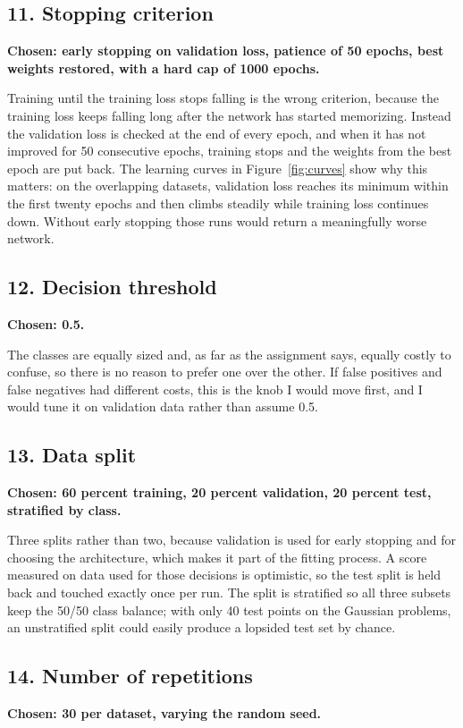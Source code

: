 \documentclass[11pt]{article}
\begin{document}
\subsection*{11. Stopping criterion}
\textbf{Chosen: early stopping on validation loss, patience of 50 epochs,
best weights restored, with a hard cap of 1000 epochs.}

Training until the training loss stops falling is the wrong criterion, because
the training loss keeps falling long after the network has started memorizing.
Instead the validation loss is checked at the end of every epoch, and when it
has not improved for 50 consecutive epochs, training stops and the weights from
the best epoch are put back. The learning curves in Figure~\ref{fig:curves} show
why this matters: on the overlapping datasets, validation loss reaches its
minimum within the first twenty epochs and then climbs steadily while training
loss continues down. Without early stopping those runs would return a
meaningfully worse network.

\subsection*{12. Decision threshold}
\textbf{Chosen: 0.5.}

The classes are equally sized and, as far as the assignment says, equally
costly to confuse, so there is no reason to prefer one over the other. If false
positives and false negatives had different costs, this is the knob I would
move first, and I would tune it on validation data rather than assume 0.5.

\subsection*{13. Data split}
\textbf{Chosen: 60 percent training, 20 percent validation, 20 percent test,
stratified by class.}

Three splits rather than two, because validation is used for early stopping and
for choosing the architecture, which makes it part of the fitting process. A
score measured on data used for those decisions is optimistic, so the test split
is held back and touched exactly once per run. The split is stratified so all
three subsets keep the 50/50 class balance; with only 40 test points on the
Gaussian problems, an unstratified split could easily produce a lopsided test
set by chance.

\subsection*{14. Number of repetitions}
\textbf{Chosen: 30 per dataset, varying the random seed.}
\end{document}
